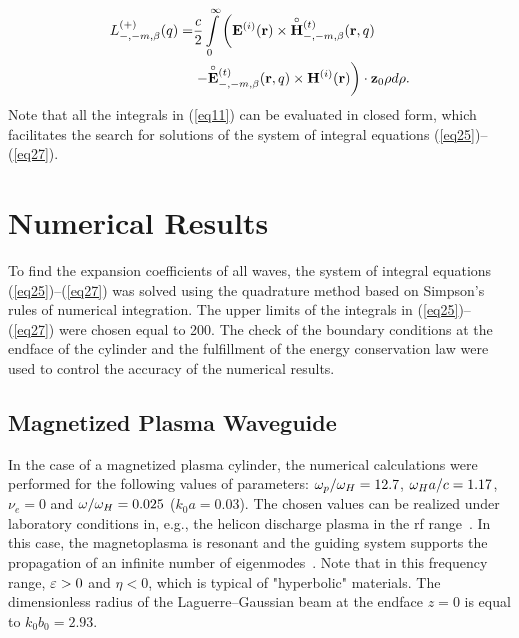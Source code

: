 \documentclass[conference,a4paper]{IEEEtran}
\begin{document}
\begin{align}
L_{- ,-m,\b}^{(+)}(q) = & \frac{c}{2}\int\limits_0^\infty \left({\bf{E}}^{(i)}({\bf{r}}) \times \lefteqn{\cir{\phantom{\bf H}}}{\bf{H}}_{-, - m,\b }^{(t)}({\bf{r}},q)\right.\nonumber\\
&\left. -   \lefteqn{\cir{\phantom{\bf E}}}{\bf{E}}_{-, - m,\b }^{(t)}({\bf{r}},q) \times {\bf{H}}^{(i)}({\bf{r}})\right)\cdot{{\bf{z}}_0}\rho d\rho.\notag
\end{align}
Note that all the integrals in (\ref{eq11}) can be evaluated in closed form, which facilitates the search for solutions of the system of integral equations (\ref{eq25})--(\ref{eq27}).


\section{Numerical Results}
To find the expansion coefficients of all waves, the system of integral equations (\ref{eq25})--(\ref{eq27}) was solved using the quadrature method based on Simpson's rules of numerical integration. The upper limits of the integrals in (\ref{eq25})--(\ref{eq27}) were chosen equal to 200. The check of the boundary conditions at the endface of the cylinder and the fulfillment of the energy conservation law were used to control the accuracy of the numerical results.

\subsection{Magnetized Plasma Waveguide}
In the case of a magnetized plasma cylinder, the numerical calculations were performed for the following values of parameters: $\omega_{p}/\omega_{H} = 12{.}7$, $\omega_{H} a/c = 1{.}17$, $\nu_e=0$ and  $\omega / \omega_H = 0.025$ ($k_0 a= 0.03$). The chosen values can be realized under laboratory conditions in, e.g., the helicon discharge plasma in the rf range~\cite{Kudrin2006}. In this case, the magnetoplasma is resonant and the guiding system supports the propagation of an infinite number of eigenmodes~\cite{Kondratev1999,Kudrin2006}. Note that in this frequency range,  $\varepsilon>0$ and $\eta<0$, which is typical of "hyperbolic" materials. The dimensionless radius of the Laguerre--Gaussian beam at the endface $z=0$ is equal to $k_0 b_0 = 2.93$.
\end{document}
